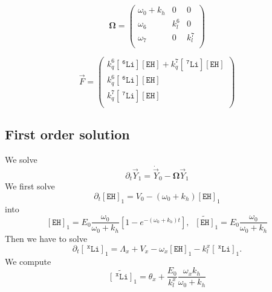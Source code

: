 \documentclass[aps,onecolumn,11pt]{revtex4}
\newcommand{\mychem}[1]{\mathtt{#1}}
\newcommand{\myconc}[1]{\left\lbrack{#1}\right\rbrack}
\newcommand{\spLi}[1]{{~^{\mychem{#1}}\mychem{Li}}}
\newcommand{\Li}[1]{\myconc{\spLi{#1}}}
\newcommand{\spEHin}{\mychem{EH}}
\newcommand{\EHin}{\myconc{\spEHin}}
\newcommand{\mymat}[1]{{\bm{#1}}}
\begin{document}
\begin{equation}
	\mymat{\Omega} = 
	\begin{pmatrix}
	\omega_0 + k_h & 0 & 0 \\
	\omega_6 & k_l^6 & 0 \\
	\omega_7 & 0 & k_l^7 \\
	\end{pmatrix}
\end{equation}

\begin{equation}
	\vec{F} = 
	\begin{pmatrix}
	k_q^6 \Li{6} \EHin + k_q^7 \Li{7} \EHin \\
	k_q^6 \Li{6} \EHin\\
	k_q^7 \Li{7} \EHin\\
	\end{pmatrix}
\end{equation}

\subsection{First order solution}
We solve
\begin{equation}
	\partial_t \vec{Y}_1 = \dot{\vec{Y}}_0 - \mymat{\Omega}\vec{Y}_1
\end{equation}
We first solve
\begin{equation}
	\partial_t \EHin_1 = V_0 - \left(\omega_0+k_h\right)  \EHin_1
\end{equation}
into
\begin{equation}
	\EHin_1 = E_0 \dfrac{\omega_0}{\omega_0+k_h}
	\left\lbrack
		 1-e^{-\left(\omega_0+k_h\right) t}
	\right\rbrack,\;\;\widetilde{\EHin}_1 = E_0 \dfrac{\omega_0}{\omega_0+k_h}
\end{equation}
Then we have to solve
\begin{equation}
	\partial_t \Li{x}_1 = \Lambda_x + V_x - \omega_x  \EHin_1 - k_l^x \Li{x}_1.
\end{equation}
We compute
\begin{equation}
	\widetilde{\Li{x}}_1 = \theta_x + \dfrac{E_0}{k_l^x}  \dfrac{\omega_x k_h}{\omega_0+k_h}
\end{equation}
\end{document}
